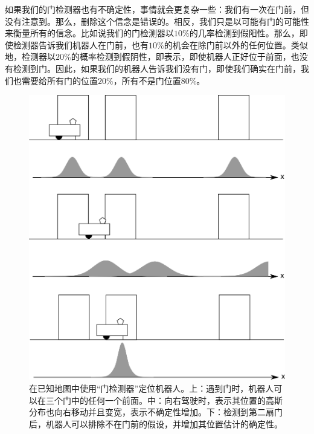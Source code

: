 如果我们的门检测器也有不确定性，事情就会更复杂一些：我们有一次在门前，但没有注意到。那么，删除这个信念是错误的。相反，我们只是以可能有门的可能性来衡量所有的信念。比如说我们的门检测器以$10\%$的几率检测到假阳性。那么，即使检测器告诉我们机器人在门前，也有$10\%$的机会在除门前以外的任何位置。类似地，检测器以$20\%$的概率检测到假阴性，即表示，即使机器人正好位于前面，也没有检测到门。因此，如果我们的机器人告诉我们没有门，即使我们确实在门前，我们也需要给所有门的位置$20\%$，所有不是门位置$80\%$。

\begin{figure}
	\centering
		\includegraphics[width=\textwidth]{figs/three_door_example}
	\caption{在已知地图中使用“门检测器”定位机器人。上：遇到门时，机器人可以在三个门中的任何一个前面。中：向右驾驶时，表示其位置的高斯分布也向右移动并且变宽，表示不确定性增加。下：检测到第二扇门后，机器人可以排除不在门前的假设，并增加其位置估计的确定性。}
	\label{fig:three_door_example}
\end{figure}

